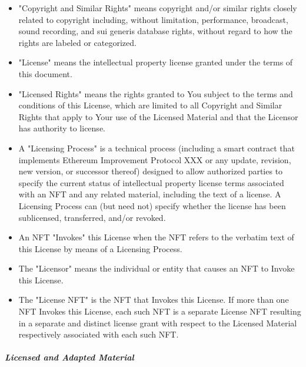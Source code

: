\documentclass{article}
\begin{document}
	\begin{itemize}	
	\item	"Copyright and Similar Rights" means copyright and/or similar rights closely related to copyright including, without limitation, performance, broadcast, sound recording, and sui generis database rights, without regard to how the rights are labeled or categorized.

	\item	"License" means the intellectual property license granted under the terms of this document.
		
	\item	"Licensed Rights" means the rights granted to You subject to the terms and conditions of this License, which are limited to all Copyright and Similar Rights that apply to Your use of the Licensed Material and that the Licensor has authority to license.

	\item	A "Licensing Process" is a technical process (including a smart contract that implements Ethereum Improvement Protocol XXX or any update, revision, new version, or successor thereof) designed to allow authorized parties to specify the current status of intellectual property license terms associated with an NFT and any related material, including the text of a license. A Licensing Process can (but need not) specify whether the license has been sublicensed, transferred, and/or revoked.

	\item	An NFT "Invokes" this License when the NFT refers to the verbatim text of this License by means of a Licensing Process.
		
	\item	The "Licensor" means the individual or entity that causes an NFT to Invoke this License.
		
	\item	The "License NFT" is the NFT that Invokes this License. If more than one NFT Invokes this License, each such NFT is a separate License NFT resulting in a separate and distinct license grant with respect to the Licensed Material respectively associated with each such NFT.
		
	\end{itemize}
		
	\subparagraph{Licensed and Adapted Material}
\end{document}
